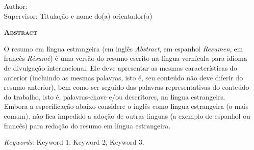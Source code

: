 \begin{center}
	{\Large{\textbf{\thesistitle}}}
\end{center}

\vspace{1cm}

\begin{flushright}
	Author: \thesisauthor\\
	Supervisor: Titulação e nome do(a) orientador(a)
\end{flushright}

\vspace{1cm}

\begin{center}
	\Large{\textsc{\textbf{Abstract}}}
\end{center}

\noindent O resumo em língua estrangeira (em inglês \textit{Abstract}, em
espanhol \textit{Resumen}, em francês \textit{Résumé}) é uma versão do resumo
escrito na língua vernícula para idioma de divulgação internacional. Ele deve
apresentar as mesmas características do anterior (incluindo as mesmas palavras,
isto é, seu conteúdo não deve diferir do resumo anterior), bem como ser seguido
das palavras representativas do conteúdo do trabalho, isto é, palavras-chave
e/ou descritores, na língua estrangeira. Embora a especificação abaixo considere
o inglês como língua estrangeira (o mais comum), não fica impedido a adoção de
outras linguas (a exemplo de espanhol ou francês) para redação do resumo em
língua estrangeira.

\noindent\textit{Keywords}: Keyword 1, Keyword 2, Keyword 3.